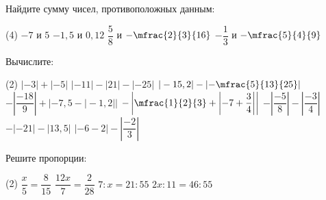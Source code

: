 \begin{homework}[number=3]
	\begin{listofex}
		\item Найдите сумму чисел, противоположных данным:
		\begin{tasks}(4)
			\task \( -7  \) и \( 5 \)
			\task \( -1,5  \) и \( 0,12 \)
			\task \( \dfrac{5}{8}  \) и \( -\mfrac{2}{3}{16} \)
			\task \( -\dfrac{1}{3}  \) и \( -\mfrac{5}{4}{9} \)
		\end{tasks}
		\item Вычислите:
		\begin{tasks}(2)
			\task \(  |-3|+|-5| \)
			\task \( |-11|-|21|-|-25|  \)
			\task \(  |-15,2|-\left|-\mfrac{5}{13}{25}\right| \)
			\task \(  -\left|\dfrac{-18}{9}\right| + |-7,5-|-1,2|| \)
			\task \(  -\left|\mfrac{1}{2}{3} + \left|-7+\dfrac{3}{4}\right|\right| \)
			\task \(  -\left|\dfrac{-5}{8}\right|-\left|\dfrac{-3}{4}\right| \)
			\task \(  -|-21|-|13,5| \)
			\task \( |-6-2| - \left|\dfrac{-2}{3}\right|  \)
		\end{tasks}
		\item Решите пропорции:
		\begin{tasks}(2)
			\task \( \dfrac{x}{5}=\dfrac{8}{15} \)
			\task \( \dfrac{12x}{7}=\dfrac{2}{28} \)
			\task \( 7:x=21:55\)
			\task \( 2x:11=46:55\)
		\end{tasks}
	\end{listofex}
\end{homework}

